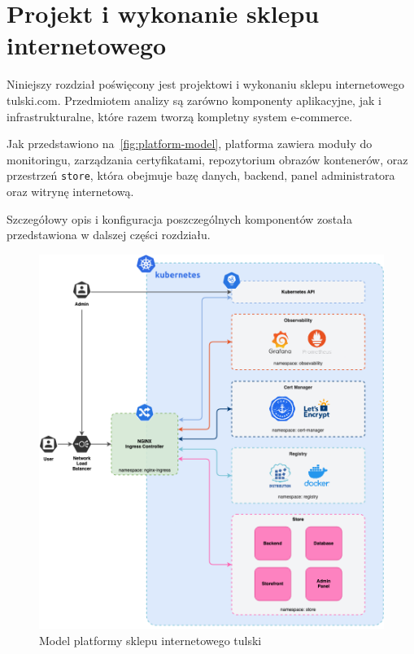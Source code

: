 \newpage


\section{Projekt i wykonanie sklepu internetowego}\label{sec:projekt-platformy}

Niniejszy rozdział poświęcony jest projektowi i wykonaniu sklepu internetowego tulski.com.
Przedmiotem analizy są zarówno komponenty aplikacyjne, jak i infrastrukturalne, które razem tworzą kompletny system e-commerce.

Jak przedstawiono na~\autoref{fig:platform-model}, platforma zawiera moduły do monitoringu, zarządzania certyfikatami, repozytorium obrazów kontenerów, oraz przestrzeń \texttt{store}, która obejmuje bazę danych, backend, panel administratora oraz witrynę internetową.

Szczegółowy opis i konfiguracja poszczególnych komponentów została przedstawiona w dalszej części rozdziału.

\begin{figure}[p]
    \centering
    \includegraphics[width=\textwidth]{img/main-infra-model}
    \caption{Model platformy sklepu internetowego tulski}
    \label{fig:platform-model}
\end{figure}

